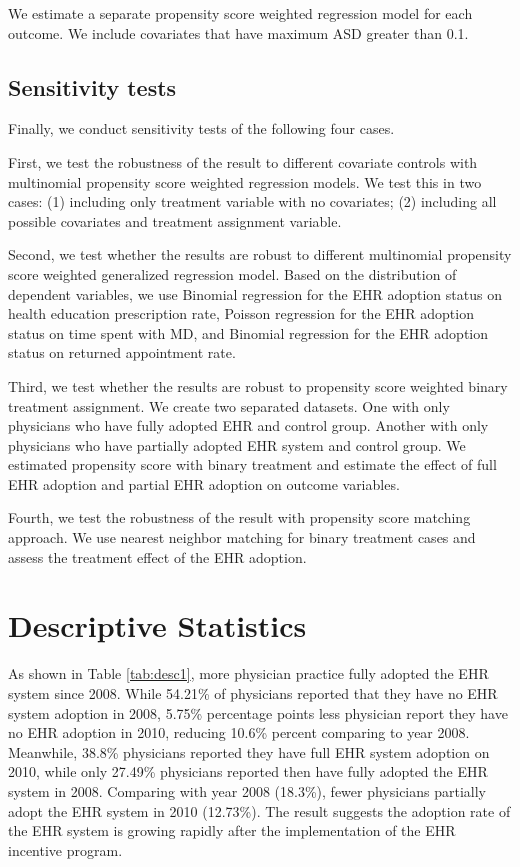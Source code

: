 \documentclass[12pt]{report}
\begin{document}
We estimate a separate propensity score weighted regression model for each outcome. We include covariates that have maximum ASD greater than 0.1. 

\section{Sensitivity tests}

Finally, we conduct sensitivity tests of the following four cases.

First, we test the robustness of the result to different covariate controls with multinomial propensity score weighted regression models. We test this in two cases: (1) including only treatment variable with no covariates; (2) including all possible covariates and treatment assignment variable.

Second, we test whether the results are robust to different multinomial propensity score weighted generalized regression model. Based on the distribution of dependent variables, we use Binomial regression for the EHR adoption status on health education prescription rate, Poisson regression for the EHR adoption status on time spent with MD, and Binomial regression for the EHR adoption status on returned appointment rate.

Third, we test whether the results are robust to propensity score weighted binary treatment assignment. We create two separated datasets. One with only physicians who have fully adopted EHR and control group. Another with only physicians who have partially adopted EHR system and control group. We estimated propensity score with binary treatment and estimate the effect of full EHR adoption and partial EHR adoption on outcome variables.

Fourth, we test the robustness of the result with propensity score matching approach. We use nearest neighbor matching for binary treatment cases and assess the treatment effect of the EHR adoption.


\chapter{Descriptive Statistics}

As shown in Table \ref{tab:desc1}, more physician practice fully adopted the EHR system since 2008. While 54.21\% of physicians reported that they have no EHR system adoption in 2008, 5.75\% percentage points less physician report they have no EHR adoption in 2010, reducing 10.6\% percent comparing to year 2008. Meanwhile, 38.8\% physicians reported they have full EHR system adoption on 2010, while only 27.49\% physicians reported then have fully adopted the EHR system in 2008. Comparing with year 2008 (18.3\%), fewer physicians partially adopt the EHR system in 2010 (12.73\%). The result suggests the adoption rate of the EHR system is growing rapidly after the implementation of the EHR incentive program.
\end{document}
